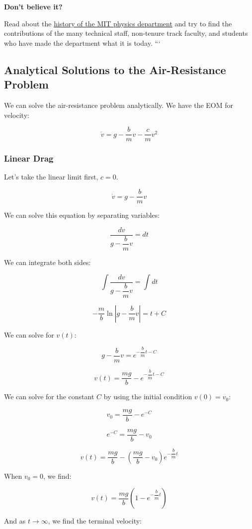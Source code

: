 \documentclass[11pt]{article}
\begin{document}
\textbf{Don't believe it?}

Read about the
\href{https://physics.mit.edu/about-physics/our-history/}{history of the
MIT physics department} and try to find the contributions of the many
technical staff, non-tenure track faculty, and students who have made
the department what it is today. ```

    \subsection{Analytical Solutions to the Air-Resistance
Problem}\label{analytical-solutions-to-the-air-resistance-problem}

We can solve the air-resistance problem analytically. We have the EOM
for velocity:

\[\dot{v} = g - \dfrac{b}{m}v - \dfrac{c}{m}v^2\]

\subsubsection{Linear Drag}\label{linear-drag}

Let's take the linear limit first, \(c=0\).

\[\dot{v} = g - \dfrac{b}{m}v\]

We can solve this equation by separating variables:

\[\dfrac{dv}{g - \dfrac{b}{m}v} = dt\]

We can integrate both sides:

\[\int \dfrac{dv}{g - \dfrac{b}{m}v} = \int dt\]

\[-\dfrac{m}{b} \ln|g - \dfrac{b}{m}v| = t + C\]

We can solve for \(v(t)\):

\[g - \dfrac{b}{m}v = e^{-\dfrac{b}{m}t - C}\]

\[v(t) = \dfrac{mg}{b} - e^{-\dfrac{b}{m}t - C}\]

We can solve for the constant \(C\) by using the initial condition
\(v(0) = v_0\):

\[v_0 = \dfrac{mg}{b} - e^{-C}\]

\[e^{-C} = \dfrac{mg}{b} - v_0\]

\[v(t) = \dfrac{mg}{b} - \left(\dfrac{mg}{b} - v_0\right)e^{-\dfrac{b}{m}t}\]

When \(v_0 = 0\), we find:

\[v(t) = \dfrac{mg}{b}\left(1 - e^{-\dfrac{b}{m}t}\right)\]

And as \(t \to \infty\), we find the terminal velocity:
\end{document}
